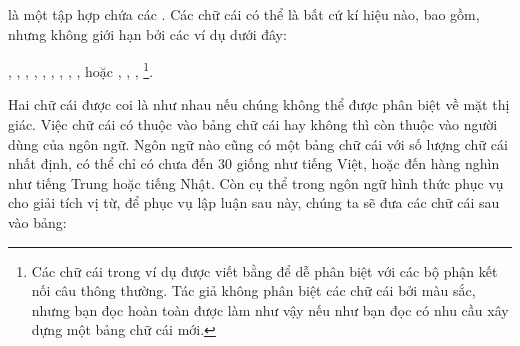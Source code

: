  là một tập hợp chứa các . Các chữ cái có thể là bất cứ kí hiệu nào, bao gồm, nhưng không giới hạn bởi các ví dụ dưới đây:
\begin{center}
   , , , , , , , \vietnamoutline, , hoặc , , , \footnote{Các chữ cái trong ví dụ được viết bằng  để dễ phân biệt với các bộ phận kết nối câu thông thường. Tác giả không phân biệt các chữ cái bởi màu sắc, nhưng bạn đọc hoàn toàn được làm như vậy nếu như bạn đọc có nhu cầu xây dựng một bảng chữ cái mới.}.
\end{center}
Hai chữ cái được coi là như nhau nếu chúng không thể được phân biệt về mặt thị giác. Việc chữ cái có thuộc vào bảng chữ cái hay không thì còn thuộc vào người dùng của ngôn ngữ. Ngôn ngữ nào cũng có một bảng chữ cái với số lượng chữ cái nhất định, có thể chỉ có chưa đến $30$ giống như tiếng Việt, hoặc đến hàng nghìn như tiếng Trung hoặc tiếng Nhật. Còn cụ thể trong ngôn ngữ hình thức phục vụ cho giải tích vị từ, để phục vụ lập luận sau này, chúng ta sẽ đưa các chữ cái sau vào bảng:
